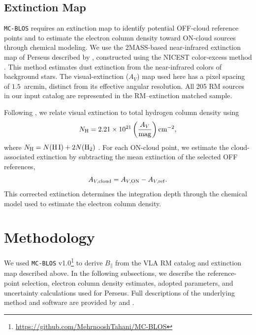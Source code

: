 \documentclass[twocolumn]{aastex701}
\begin{document}
\subsection{Extinction Map}


  \texttt{MC-BLOS} requires an extinction map to identify potential OFF-cloud
  reference points and to estimate the electron column density toward
  ON-cloud sources through chemical modeling. We use the 2MASS-based
  near-infrared extinction map of Perseus described by
  \citet{kainulainen2009}, constructed using the NICEST color-excess
  method \citep{lombardi2009nicest}. This method estimates dust extinction
  from the near-infrared colors of background stars. The visual-extinction
  ($A_V$) map used here has a pixel spacing of $1.5$~arcmin, distinct
  from its effective angular resolution. All 205 RM sources in our input
  catalog are represented in the RM--extinction matched sample.

  Following \citet{tahani2025mcblos}, we relate visual extinction to total
  hydrogen column density using
  \begin{equation}
  N_{\rm H}
  = 2.21 \times 10^{21}
  \left(\frac{A_V}{\mathrm{mag}}\right)\mathrm{cm}^{-2},
  \end{equation}
  where $N_{\rm H}=N(\mathrm{H\,I})+2N(\mathrm{H}_2)$
  \citep{guver2009relation}. For each ON-cloud point, we estimate
  the cloud-associated extinction by subtracting the mean extinction
  of the selected OFF references,
  \begin{equation}
  A_{V,\rm cloud}=A_{V,\rm ON}-A_{V,\rm ref}.
  \end{equation}
  This corrected extinction determines the integration depth through
  the chemical model used to estimate the electron column density.
\section{Methodology}
  \label{sec:method}
We used \texttt{MC-BLOS} v1.0\footnote{\url{https://github.com/MehrnooshTahani/MC-BLOS}} \citep{tahani2025mcblos} to derive $B_\parallel$ from the VLA RM catalog and extinction map described above. In the following subsections, we describe the reference-point selection, electron column density estimates, adopted parameters, and uncertainty calculations used for Perseus. Full descriptions of the underlying method and software are provided by \citet{tahani2018} and \citet{tahani2025mcblos}.
\end{document}
